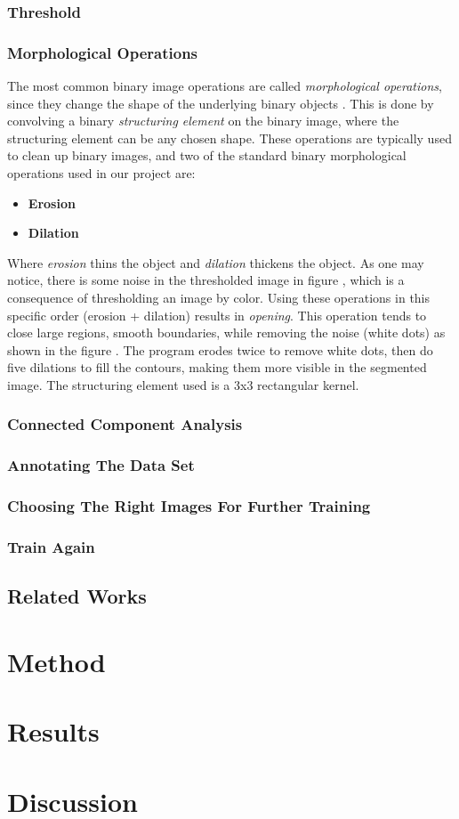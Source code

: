 \documentclass[USenglish]{ifimaster}  %
\begin{document}
\subsection{Threshold}
\subsection{Morphological Operations}
The most common binary image operations are called \textit{morphological operations}, since
they change the shape of the underlying binary objects \cite{Ritter}. This is done by convolving a binary \textit{structuring element} on the binary image, where the structuring element can be any chosen shape. These operations are typically used to clean up binary images, and two of the standard binary morphological operations used in our project are: 
\begin{itemize}
    \item \textbf{Erosion}
    \item \textbf{Dilation}
\end{itemize}

Where \textit{erosion} thins the object and \textit{dilation} thickens the object. As one may notice, there is some noise in the thresholded image in figure , which is a consequence of thresholding an image by color. Using these operations in this specific order (erosion + dilation) results in \textit{opening}. This operation tends to close large regions, smooth boundaries, while removing the noise (white dots) as shown in the figure . The program erodes twice to remove white dots, then do five dilations to fill the contours, making them more visible in the segmented image. The structuring element used is a 3x3 rectangular kernel.

\subsection{Connected Component Analysis}
\subsection{Annotating The Data Set}
\subsection{Choosing The Right Images For Further Training}
\subsection{Train Again}
\section{Related Works}

\chapter{Method}

\chapter{Results}                     

\chapter{Discussion}



\backmatter{}
\printbibliography
\end{document}

